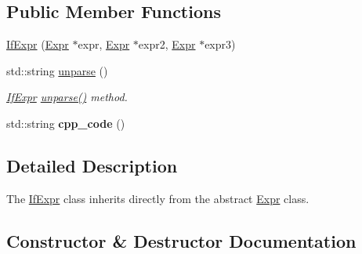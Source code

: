 \subsection*{Public Member Functions}
\begin{DoxyCompactItemize}
\item 
\hyperlink{classfcal_1_1ast_1_1IfExpr_a96d71744e60f8075805e269ad01599f4}{If\+Expr} (\hyperlink{classfcal_1_1ast_1_1Expr}{Expr} $\ast$expr, \hyperlink{classfcal_1_1ast_1_1Expr}{Expr} $\ast$expr2, \hyperlink{classfcal_1_1ast_1_1Expr}{Expr} $\ast$expr3)
\item 
std\+::string \hyperlink{classfcal_1_1ast_1_1IfExpr_a4092cf20150a2cde02364d4c7233e558}{unparse} ()
\begin{DoxyCompactList}\small\item\em \hyperlink{classfcal_1_1ast_1_1IfExpr}{If\+Expr} \hyperlink{classfcal_1_1ast_1_1IfExpr_a4092cf20150a2cde02364d4c7233e558}{unparse()} method. \end{DoxyCompactList}\item 
std\+::string {\bfseries cpp\+\_\+code} ()\hypertarget{classfcal_1_1ast_1_1IfExpr_a8d6e41c15a9586eae9b440ef7a1c80ea}{}\label{classfcal_1_1ast_1_1IfExpr_a8d6e41c15a9586eae9b440ef7a1c80ea}

\end{DoxyCompactItemize}


\subsection{Detailed Description}
The \hyperlink{classfcal_1_1ast_1_1IfExpr}{If\+Expr} class inherits directly from the abstract \hyperlink{classfcal_1_1ast_1_1Expr}{Expr} class. 

\subsection{Constructor \& Destructor Documentation}
